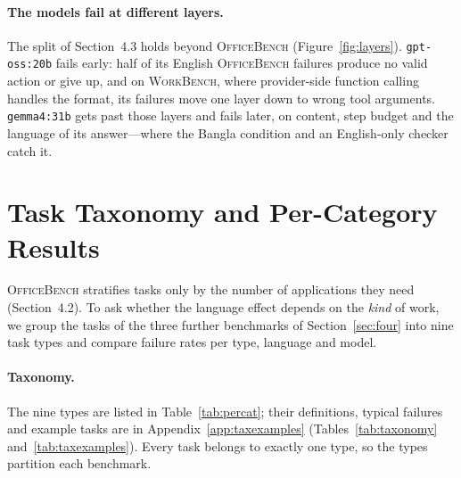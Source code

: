 \documentclass[11pt]{article}
\begin{document}
\paragraph{The models fail at different layers.} The split of Section~4.3 holds beyond
\textsc{OfficeBench} (Figure~\ref{fig:layers}). \texttt{gpt-oss:20b} fails early: half of its
English \textsc{OfficeBench} failures produce no valid action or give up, and on
\textsc{WorkBench}, where provider-side function calling handles the format, its failures move
one layer down to wrong tool arguments. \texttt{gemma4:31b} gets past those layers and fails
later, on content, step budget and the language of its answer---where the Bangla condition and an
English-only checker catch it.

\section{Task Taxonomy and Per-Category Results}
\label{sec:taxonomy}

\textsc{OfficeBench} stratifies tasks only by the number of applications they need
(Section~4.2). To ask whether the language effect depends on the \emph{kind} of work, we group
the tasks of the three further benchmarks of Section~\ref{sec:four} into nine task types and
compare failure rates per type, language and model.

\paragraph{Taxonomy.} The nine types are listed in Table~\ref{tab:percat}; their definitions,
typical failures and example tasks are in Appendix~\ref{app:taxexamples}
(Tables~\ref{tab:taxonomy} and~\ref{tab:taxexamples}). Every task belongs to exactly one type,
so the types partition each benchmark.
\end{document}
